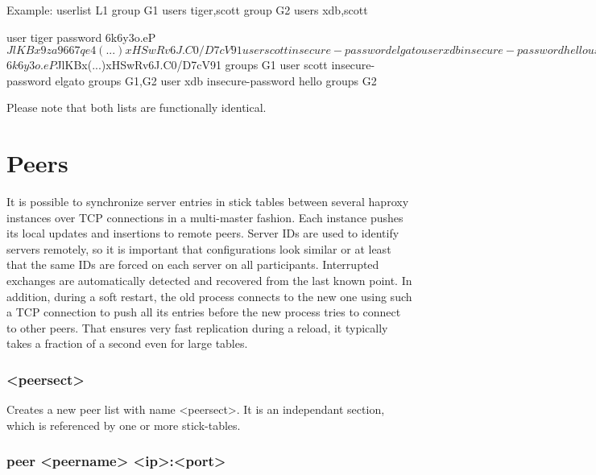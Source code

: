 \begin{example}{Example:}
        userlist L1
          group G1 users tiger,scott
          group G2 users xdb,scott

          user tiger password $6$k6y3o.eP$JlKBx9za9667qe4(...)xHSwRv6J.C0/D7cV91
          user scott insecure-password elgato
          user xdb insecure-password hello

        userlist L2
          group G1
          group G2

          user tiger password $6$k6y3o.eP$JlKBx(...)xHSwRv6J.C0/D7cV91 groups G1
          user scott insecure-password elgato groups G1,G2
          user xdb insecure-password hello groups G2
\end{example}

  Please note that both lists are functionally identical.

\section{Peers}
\label{sec:peers}

It is possible to synchronize server entries in stick tables between several
haproxy instances over TCP connections in a multi-master fashion. Each instance
pushes its local updates and insertions to remote peers. Server IDs are used to
identify servers remotely, so it is important that configurations look similar
or at least that the same IDs are forced on each server on all participants.
Interrupted exchanges are automatically detected and recovered from the last
known point. In addition, during a soft restart, the old process connects to
the new one using such a TCP connection to push all its entries before the new
process tries to connect to other peers. That ensures very fast replication
during a reload, it typically takes a fraction of a second even for large
tables.

\subsubsection[peers]{ <peersect>}

Creates a new peer list with name <peersect>. It is an independant section,
which is referenced by one or more stick-tables.

\subsubsection[peer]{peer <peername> <ip>:<port>}

